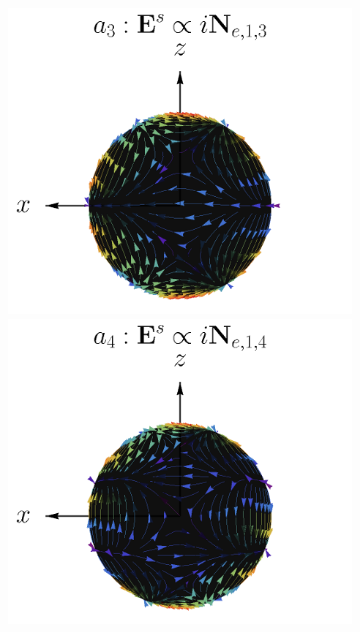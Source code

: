 \documentclass[letterpaper,11pt] {article}
\begin{document}
\begin{figure}[h]
\begin{subfigure}{.9\linewidth}
			\includegraphics[scale=.25]{1-Teoria/figs/Ne13_static_crop.png}%
			\includegraphics[scale=.25]{1-Teoria/figs/Ne14_static_crop.png}%
		\end{subfigure}\\
		\hspace{-4em}	
		\begin{subfigure}{.05\linewidth}\vspace{-3.25cm}\label{figs:MagneticMultipoles} \caption{ } \end{subfigure}
		\hspace{-3em}

\end{figure}
\end{document}
